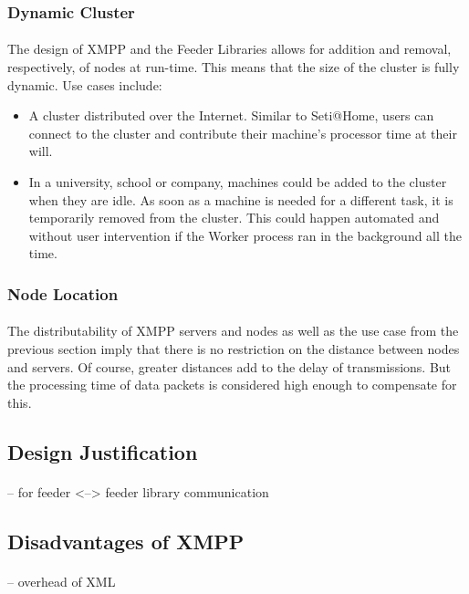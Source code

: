 \subsubsection{Dynamic Cluster}
\paragraph{}
The design of XMPP and the Feeder Libraries allows for addition and removal, respectively, of nodes at run-time. This means that the size of the cluster is fully dynamic. Use cases include:
\begin{itemize}
\item A cluster distributed over the Internet. Similar to Seti@Home, users can connect to the cluster and contribute their machine's processor time at their will.
\item In a university, school or company, machines could be added to the cluster when they are idle. As soon as a machine is needed for a different task, it is temporarily removed from the cluster. This could happen automated and without user intervention if the Worker process ran in the background all the time.
\end{itemize}

\subsubsection{Node Location}
\paragraph{}
The distributability of XMPP servers and nodes as well as the use case from the previous section imply that there is no restriction on the distance between nodes and servers. Of course, greater distances add to the delay of transmissions. But the processing time of data packets is considered high enough to compensate for this.

\subsection{Design Justification}
\paragraph{}
-- for feeder <--> feeder library communication

\subsection{Disadvantages of XMPP}
\paragraph{}
-- overhead of XML
